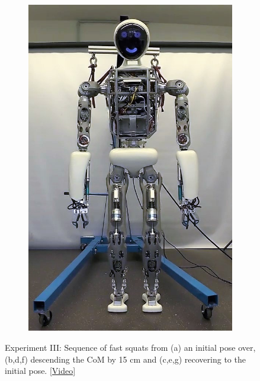 \begin{figure}[h!]
\begin{subfigure}{.14\textwidth}
	\includegraphics[width=.95\linewidth]{experiments/squats/snaps/7}
	\caption{}
	\end{subfigure}%
\caption[Experiment III: Sequence of fast squats]{Experiment III: Sequence of fast squats from (a) an initial pose over, (b,d,f) descending the \gls{CoM} by 15 cm and (c,e,g) recovering to the initial pose. \href{https://github.com/julesser/ma-thesis-experimental-results/blob/master/squats/squat15cm_2s.mp4}{[Video]}}
\label{exp:squatSnaps}
\end{figure} 

